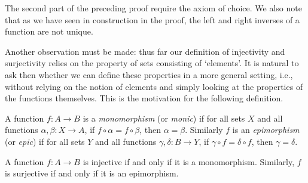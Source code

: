 \begin{remark}
    The second part of the preceding proof require the axiom of choice. We also
    note that as we have seen in construction in the proof, the left and right
    inverses of a function are not unique.

    Another observation must be made: thus far our definition of injectivity and
    surjectivity relies on the property of sets consisting of `elements'. It is
    natural to ask then whether we can define these properties in a more general
    setting, i.e., without relying on the notion of elements and simply looking
    at the properties of the functions themselves. This is the motivation for
    the following definition.
\end{remark}

\begin{definition}
    \label{def:monomorphism-epimorphism-set}
    A function \(f: A \to B\) is a \emph{monomorphism} (or \emph{monic}) if for
    all sets \(X\) and all functions \(\alpha, \beta: X \to A\), if \(f \circ
    \alpha = f \circ \beta\), then \(\alpha = \beta\). Similarly \(f\) is an
    \emph{epimorphism} (or \emph{epic}) if for all sets \(Y\) and all functions
    \(\gamma, \delta: B \to Y\), if \(\gamma \circ f = \delta \circ f\), then
    \(\gamma = \delta\).
\end{definition}

\begin{theorem}
    \label{thm:injective-surjective-monomorphism-epimorphism}
    A function \(f: A \to B\) is injective if and only if it is a monomorphism.
    Similarly, \(f\) is surjective if and only if it is an epimorphism.
\end{theorem}

